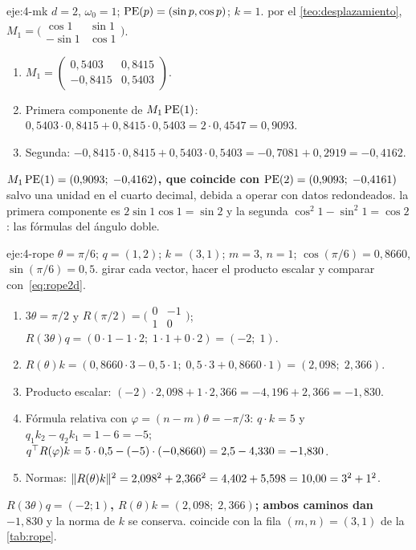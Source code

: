 \begin{solucion}{eje:4-mk}
\datos $d=2$, $\omega_0=1$; $\operatorname{PE}(p)=(\sin p,\cos p)$; $k=1$.
\planteamiento por el \cref{teo:desplazamiento}, $M_1=\bigl(\begin{smallmatrix}\cos 1&\sin 1\\-\sin 1&\cos 1\end{smallmatrix}\bigr)$.
\pasos
\begin{enumerate}[label=\arabic*.]
  \item $M_1=\begin{pmatrix}0{,}5403&0{,}8415\\-0{,}8415&0{,}5403\end{pmatrix}$.
  \item Primera componente de $M_1\operatorname{PE}(1)$: $0{,}5403\cdot 0{,}8415+0{,}8415\cdot 0{,}5403=2\cdot 0{,}4547=0{,}9093$.
  \item Segunda: $-0{,}8415\cdot 0{,}8415+0{,}5403\cdot 0{,}5403=-0{,}7081+0{,}2919=-0{,}4162$.
\end{enumerate}
\resultado \textbf{$M_1\operatorname{PE}(1)=(0{,}9093;\;-0{,}4162)$, que coincide con $\operatorname{PE}(2)=(0{,}9093;\;-0{,}4161)$} salvo una unidad en el cuarto decimal, debida a operar con datos redondeados.
\comprobacion la primera componente es $2\sin 1\cos 1=\sin 2$ y la segunda $\cos^{2}1-\sin^{2}1=\cos 2$: las fórmulas del ángulo doble.
\end{solucion}

\begin{solucion}{eje:4-rope}
\datos $\theta=\pi/6$; $q=(1,2)$; $k=(3,1)$; $m=3$, $n=1$; $\cos(\pi/6)=0{,}8660$, $\sin(\pi/6)=0{,}5$.
\planteamiento girar cada vector, hacer el producto escalar y comparar con~\eqref{eq:rope2d}.
\pasos
\begin{enumerate}[label=\arabic*.]
  \item $3\theta=\pi/2$ y $R(\pi/2)=\bigl(\begin{smallmatrix}0&-1\\1&0\end{smallmatrix}\bigr)$; $R(3\theta)q=(0\cdot 1-1\cdot 2;\;1\cdot 1+0\cdot 2)=(-2;\;1)$.
  \item $R(\theta)k=(0{,}8660\cdot 3-0{,}5\cdot 1;\;0{,}5\cdot 3+0{,}8660\cdot 1)=(2{,}098;\;2{,}366)$.
  \item Producto escalar: $(-2)\cdot 2{,}098+1\cdot 2{,}366=-4{,}196+2{,}366=-1{,}830$.
  \item Fórmula relativa con $\varphi=(n-m)\theta=-\pi/3$: $q\cdot k=5$ y $q_1k_2-q_2k_1=1-6=-5$; $q^{\top} R(\varphi)k=5\cdot 0{,}5-(-5)\cdot(-0{,}8660)=2{,}5-4{,}330=-1{,}830$.
  \item Normas: $\lVert R(\theta)k\rVert^{2}=2{,}098^{2}+2{,}366^{2}=4{,}402+5{,}598=10{,}00=3^{2}+1^{2}$.
\end{enumerate}
\resultado \textbf{$R(3\theta)q=(-2;1)$, $R(\theta)k=(2{,}098;\;2{,}366)$; ambos caminos dan $-1{,}830$} y la norma de $k$ se conserva.
\comprobacion coincide con la fila $(m,n)=(3,1)$ de la \cref{tab:rope}.
\end{solucion}

